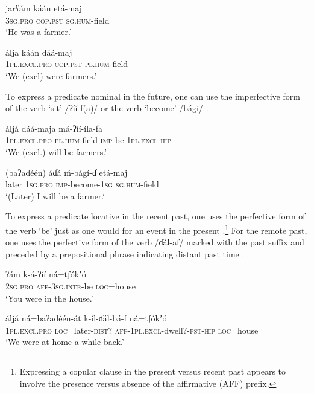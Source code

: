 \documentclass[output=paper]{langsci/langscibook}
\begin{document}
\ea\label{ex:ahlandc:75}
\gll
jarʕ\'{a}m  k\'{a}\'{a}n  et\'{a}-maj  \\
\textsc{3sg.pro}    \textsc{cop.pst}  \textsc{sg.hum}{}-field\\
\glt
‘He was a farmer.’
\z

\ea\label{ex:ahlandc:76}
\gll
\'{a}lja    k\'{a}\'{a}n    d\'{a}\'{a}-maj\\
\textsc{1pl.excl.pro}   \textsc{cop.pst}    \textsc{pl.hum}{}-field\\
\glt
‘We (excl) were farmers.’
\z

To express a predicate nominal in the future, one can use the imperfective form of the verb ‘sit’ /ʔ\'{i}\'{i}-f(a)/  or the verb ‘become’ /b\'{a}gi/ .

\ea\label{ex:ahlandc:77}
\gll
\'{a}lj\'{a}      d\'{a}\'{a}-maja  m\'{a}-ʔ\'{i}\'{i}-\'{i}la-fa\\
\textsc{1pl.excl.pro}    \textsc{pl.hum}{}-field   \textsc{imp}{}-be-\textsc{1pl.excl-hip}\\
\glt
‘We (excl.) will be farmers.’
\z

\ea\label{ex:ahlandc:78}
\gll
(baʔad\'{e}\'{e}n) \'{a}ɗ\'{a}          \'{m}-b\'{a}g\'{i}-ɗ     et\'{a}-maj \\
later           \textsc{1sg.pro}   \textsc{imp}{}-become-\textsc{1sg}   \textsc{sg.hum}{}-field\\
 \glt
 ‘(Later) I will be a farmer.‘  
\z

To express a predicate locative in the recent past, one uses the perfective form of the verb ‘be’ just as one would for an event in the present .\footnote{Expressing a copular clause in the present versus recent past appears to involve the presence versus absence of the affirmative (AFF) prefix.} For the remote past, one uses the perfective form of the verb /ɗ\'{a}l-af/ marked with the past suffix and preceded by a prepositional phrase indicating distant past time .

\ea\label{ex:ahlandc:79}
\gll
ʔ\'{a}m         k-\'{a}-ʔ\'{i}\'{i}                    n\'{a}=tʃ\'{o}kʼ\'{o}\\
\textsc{2sg}\textsc{.pro}   \textsc{aff-3sg.intr}{}-be  \textsc{loc}=house\\
\glt
‘You were in the house.’
\z

\ea\label{ex:ahlandc:80}
\gll
\'{a}lj\'{a}    n\'{a}=baʔad\'{e}\'{e}n-\'{a}t  k-\'{i}l-ɗ\'{a}l-b\'{a}-f       n\'{a}=tʃ\'{o}kʼ\'{o}\\
\textsc{1pl.excl.pro}   \textsc{loc}=later-\textsc{dist?}      \textsc{aff-1pl.excl}{}-dwell?-\textsc{pst-hip}  \textsc{loc}=house\\
\glt
‘We were at home a while back.’
\z
\end{document}

